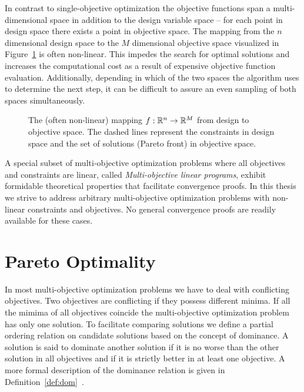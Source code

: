 In contrast to single-objective optimization the objective functions span
  a multi-dimensional space in addition to the design variable space --
  for each point in design space there exists a point in objective space.
The mapping from the $n$ dimensional design space to the $M$ dimensional
  objective space visualized in Figure~\ref{fig:des_to_obj} is often
  non-linear.
This impedes the search for optimal solutions and increases the computational
  cost as a result of expensive objective function evaluation.
Additionally, depending in which of the two spaces the algorithm uses to
  determine the next step, it can be difficult to assure an even sampling of
  both spaces simultaneously.
%
\begin{figure}
  \begin{center}
    \begin{tikzpicture}
      
    \end{tikzpicture}
  \end{center}
  \caption{The (often non-linear) mapping $f : \R^n \rightarrow
    \R^M$ from design to objective space. The dashed lines represent
    the constraints in design space and the set of solutions (Pareto front) in objective space.
    }
  \label{fig:des_to_obj}
\end{figure}

A special subset of multi-objective optimization problems where all objectives
  and constraints are linear, called \textit{Multi-objective linear programs},
  exhibit formidable theoretical properties that facilitate convergence proofs.
In this thesis we strive to address arbitrary multi-objective optimization
  problems with non-linear constraints and objectives.
No general convergence proofs are readily available for these cases.


\section{Pareto Optimality}

In most multi-objective optimization problems we have to deal with conflicting
  objectives.
Two objectives are conflicting if they possess different minima.
If all the mimima of all objectives coincide the multi-objective optimization
  problem has only one solution.
To facilitate comparing solutions we define a partial ordering relation on
  candidate solutions based on the concept of dominance.
A solution is said to dominate another solution if it is no worse than the
  other solution in all objectives and if it is strictly better in at least
  one objective.
A more formal description of the dominance relation is given in
  Definition~\ref{def:dom}~\cite{deb:09}.

